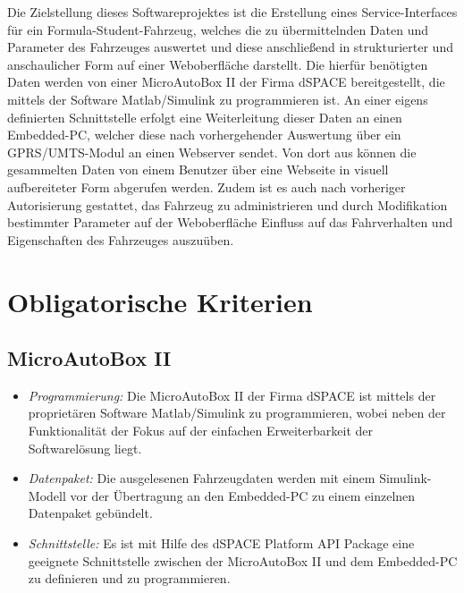 \documentclass[fontsize = 12pt, paper = a4]{scrreprt}
\begin{document}
Die Zielstellung dieses Softwareprojektes ist die Erstellung eines \gls{Service-Interface}s für ein Formula-Student-Fahrzeug, welches die zu übermittelnden Daten und Parameter des Fahrzeuges auswertet und diese anschließend in strukturierter und anschaulicher Form auf einer Weboberfläche darstellt. Die hierfür benötigten Daten werden von einer \gls{MicroAutoBox II} der Firma dSPACE bereitgestellt, die mittels der Software \gls{Matlab/Simulink} zu programmieren ist. An einer eigens definierten Schnittstelle erfolgt eine Weiterleitung dieser Daten an   
einen \gls{Embedded-PC}, welcher diese nach vorhergehender Auswertung  über ein \gls{GPRS}/\gls{UMTS}-Modul an einen Webserver sendet. Von dort aus können die gesammelten Daten von einem Benutzer über eine Webseite in visuell aufbereiteter Form abgerufen werden. Zudem ist es auch nach vorheriger Autorisierung gestattet, das Fahrzeug zu administrieren und durch Modifikation bestimmter Parameter auf der Weboberfläche Einfluss auf das Fahrverhalten und Eigenschaften des Fahrzeuges auszuüben.


\section{Obligatorische Kriterien}


\subsection{\gls{MicroAutoBox II}}

\begin{itemize}

\item \textit{Programmierung:} Die \gls{MicroAutoBox II} der Firma dSPACE ist mittels der proprietären Software \gls{Matlab/Simulink} zu programmieren, wobei neben der Funktionalität der Fokus auf der einfachen Erweiterbarkeit der Softwarelösung liegt. 

\item \textit{Datenpaket:} Die ausgelesenen Fahrzeugdaten werden mit einem Simulink-Modell vor der Übertragung an den \gls{Embedded-PC} zu einem einzelnen Datenpaket gebündelt. 

\item \textit{Schnittstelle:} Es ist mit Hilfe des dSPACE Platform \gls{API} Package eine geeignete Schnittstelle zwischen der \gls{MicroAutoBox II} und dem \gls{Embedded-PC} zu definieren und zu programmieren. 

 
\end{itemize}
\end{document}
